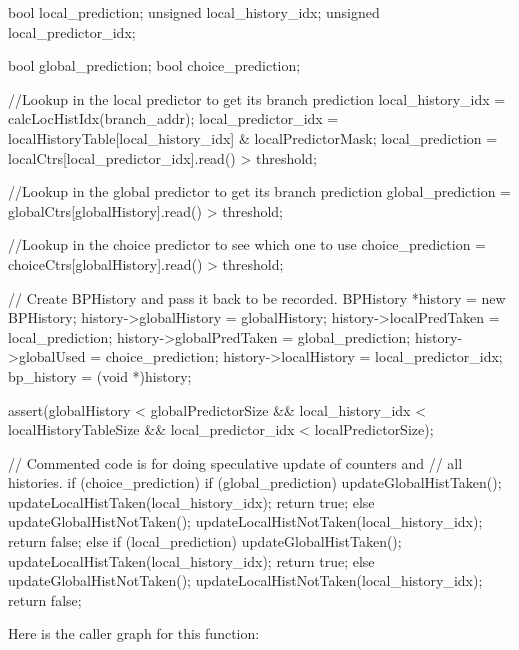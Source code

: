 \begin{DoxyCode}
{
    bool local_prediction;
    unsigned local_history_idx;
    unsigned local_predictor_idx;

    bool global_prediction;
    bool choice_prediction;

    //Lookup in the local predictor to get its branch prediction
    local_history_idx = calcLocHistIdx(branch_addr);
    local_predictor_idx = localHistoryTable[local_history_idx]
        & localPredictorMask;
    local_prediction = localCtrs[local_predictor_idx].read() > threshold;

    //Lookup in the global predictor to get its branch prediction
    global_prediction = globalCtrs[globalHistory].read() > threshold;

    //Lookup in the choice predictor to see which one to use
    choice_prediction = choiceCtrs[globalHistory].read() > threshold;

    // Create BPHistory and pass it back to be recorded.
    BPHistory *history = new BPHistory;
    history->globalHistory = globalHistory;
    history->localPredTaken = local_prediction;
    history->globalPredTaken = global_prediction;
    history->globalUsed = choice_prediction;
    history->localHistory = local_predictor_idx;
    bp_history = (void *)history;

    assert(globalHistory < globalPredictorSize &&
           local_history_idx < localHistoryTableSize &&
           local_predictor_idx < localPredictorSize);

    // Commented code is for doing speculative update of counters and
    // all histories.
    if (choice_prediction) {
        if (global_prediction) {
            updateGlobalHistTaken();
            updateLocalHistTaken(local_history_idx);
            return true;
        } else {
            updateGlobalHistNotTaken();
            updateLocalHistNotTaken(local_history_idx);
            return false;
        }
    } else {
        if (local_prediction) {
            updateGlobalHistTaken();
            updateLocalHistTaken(local_history_idx);
            return true;
        } else {
            updateGlobalHistNotTaken();
            updateLocalHistNotTaken(local_history_idx);
            return false;
        }
    }
}
\end{DoxyCode}


Here is the caller graph for this function:


